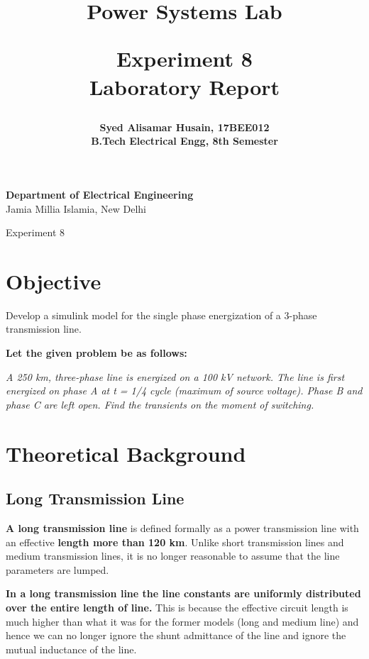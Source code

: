 \documentclass[12pt]{article}
\title{
  {\Huge \bf Power Systems Lab}\\
  \vspace{0.25in}

  {\bf Experiment 8}\\
  Laboratory Report
  \vspace{1in}
}
\author{
  \bf Syed Alisamar Husain, 17BEE012\\
  B.Tech Electrical Engg, 8th Semester
}
\begin{document}
  \begin{titlepage}
    \maketitle
    \vspace*{\fill}
    \begin{center}
      {\bfseries Department of Electrical Engineering} \\
      Jamia Millia Islamia, New Delhi
    \end{center}
    \thispagestyle{empty}
  \end{titlepage}
  
  \newpage
  \begin{center}
    \huge Experiment 8
    \vspace{0.5in}
  \end{center}

  \section{Objective}
  Develop a simulink model for the single phase 
  energization of a 3-phase transmission line.

  {\bf Let the given problem be as follows:}
  \begin{center}
    \it
    A 250 km, three-phase line is energized on a 100 kV network. 
    The line is first energized on phase A at t = 1/4 cycle 
    (maximum of source voltage). Phase B and phase C are left open. 
    Find the transients on the moment of switching.
  \end{center}

  \section{Theoretical Background}
    \subsection{Long Transmission Line}
    {\bf A long transmission line} is defined formally as a power transmission 
    line with an effective {\bf length more than 120 km}. 
    Unlike short transmission lines and medium transmission lines, 
    it is no longer reasonable to assume that the line parameters 
    are lumped. 

    {\bf In a long transmission line the line constants are uniformly 
    distributed over the entire length of line.} This is because the 
    effective circuit length is much higher than what it was for the 
    former models (long and medium line) and hence we can no longer 
    ignore the shunt admittance of the line and 
    ignore the mutual inductance of the line.
\end{document}
